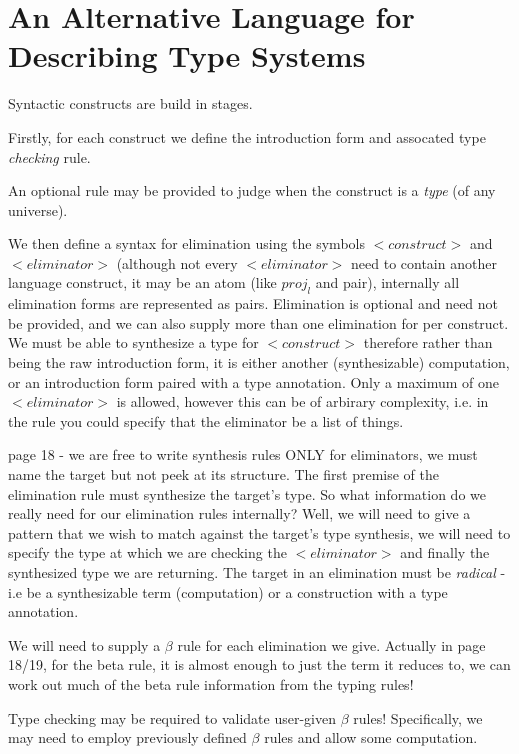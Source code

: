 \chapter{An Alternative Language for Describing Type Systems}

Syntactic constructs are build in stages.

Firstly, for each construct we define the introduction form and
assocated type \emph{checking} rule.

An optional rule may be provided to judge when the construct is a
\emph{type} (of any universe). 

We then define a syntax for elimination using the symbols $<construct>$
and $<eliminator>$ (although not every $<eliminator>$ need to contain
another language construct, it may be an atom (like $proj_l$ and
pair), internally all elimination forms are represented as
pairs. Elimination is optional and need not be provided, and we can
also supply more than one elimination for per construct. We must be
able to synthesize a type for $<construct>$ therefore rather than
being the raw introduction form, it is either another (synthesizable)
computation, or an introduction form paired with a type
annotation. Only a maximum of one $<eliminator>$ is allowed, however
this can be of arbirary complexity, i.e. in the rule you could specify
that the eliminator be a list of things.

\cite{TypesWhoSayNi} page 18 - we are free to write synthesis rules
ONLY for eliminators, we must name the target but not peek at its
structure. The first premise of the elimination rule must synthesize
the target's type. So what information do we really need for our
elimination rules internally? Well, we will need to give a pattern
that we wish to match against the target's type synthesis, we will
need to specify the type at which we are checking the $<eliminator>$
and finally the synthesized type we are returning. The target in an
elimination must be \emph{radical} - i.e be a synthesizable term
(computation) or a construction with a type annotation.

We will need to supply a $\beta$ rule for each elimination we
give. Actually in \cite{TypesWhoSayNi} page 18/19, for the beta rule,
it is almost enough to just the term it reduces to, we can work out
much of the beta rule information from the typing rules!

Type checking may be required to validate user-given $\beta$ rules!
Specifically, we may need to employ previously defined $\beta$ rules
and allow some computation.

